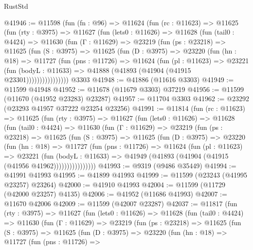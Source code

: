 \begin{lexlean}{RustStd}
\begin{coremodule}
@41946 := @11598
    (fun (fn : @96) =>
    @11624
      (fun (rc : @11623) =>
      @11625
        (fun (rty : @3975) =>
        @11627
          (fun (lets0 : @11626) =>
          @11628
            (fun (tail0 : @4424) =>
            @11630
              (fun (Γ : @11629) =>
              @23219
                (fun (ps : @23218) =>
                @11625
                  (fun (S : @3975) =>
                  @11625
                    (fun (D : @3975) =>
                    @23220
                      (fun (hn : @18) =>
                      @11727
                        (fun (pns : @11726) =>
                        @11624
                          (fun (pl : @11623) =>
                          @23221
                            (fun (bodyL : @11633) =>
                            @41888 (@41893 (@41904 (@41915 @23301))))))))))))))))
    @3303
@41948 := @41886 (@11616 @3303)
@41949 := @11599 @41948
@41952 := @11678 (@11679 @3303) @37219
@41956 := @11599 (@11670 (@41952 @23283) @23287)
@41957 := @11704 @3303
@41962 := @23292 (@23293 @41957 @37222 @23254 @23256)
@41991 := @11814
    (fun (rc : @11623) =>
    @11625
      (fun (rty : @3975) =>
      @11627
        (fun (lets0 : @11626) =>
        @11628
          (fun (tail0 : @4424) =>
          @11630
            (fun (Γ : @11629) =>
            @23219
              (fun (ps : @23218) =>
              @11625
                (fun (S : @3975) =>
                @11625
                  (fun (D : @3975) =>
                  @23220
                    (fun (hn : @18) =>
                    @11727
                      (fun (pns : @11726) =>
                      @11624
                        (fun (pl : @11623) =>
                        @23221
                          (fun (bodyL : @11633) =>
                          @41949 (@41893 (@41904 (@41915 (@41956 @41962))))))))))))))))
@41993 := @9319 (@9486 @35449)
@41994 := @41991 @41993
@41995 := @41899 @41993
@41999 := @11599 (@23243 (@41995 @23257) @23264)
@42000 := @41910 @41993
@42004 := @11599 (@11729 (@42000 @23257) @4135)
@42006 := @41952 (@11686 @41993)
@42007 := @11670 @42006
@42009 := @11599 (@42007 @23287)
@42037 := @11817
    (fun (rty : @3975) =>
    @11627
      (fun (lets0 : @11626) =>
      @11628
        (fun (tail0 : @4424) =>
        @11630
          (fun (Γ : @11629) =>
          @23219
            (fun (ps : @23218) =>
            @11625
              (fun (S : @3975) =>
              @11625
                (fun (D : @3975) =>
                @23220
                  (fun (hn : @18) =>
                  @11727
                    (fun (pns : @11726) =>

\end{coremodule}
\end{lexlean}
